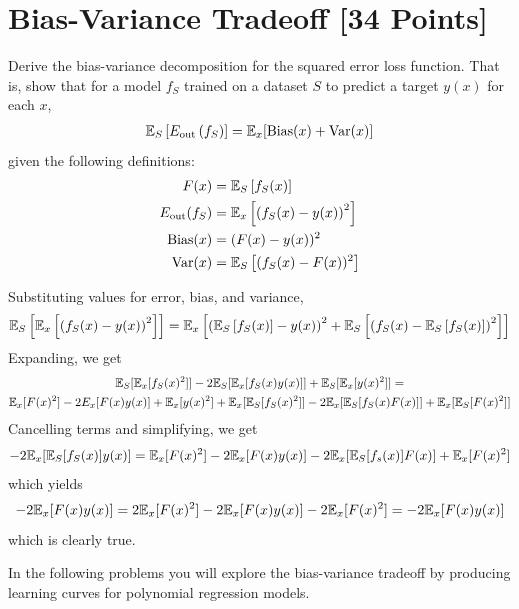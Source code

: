 
\newpage
\section{Bias-Variance Tradeoff [34 Points]}

\begin{problem}[5]
  Derive the bias-variance decomposition for the squared error loss function. That is, show that for a model $f_S$ trained on a dataset $S$ to predict a target $y(x)$ for each $x$,
  \begin{align*}
    \mathbb{E}_S \left[E_\text{out}\left(f_S\right)\right] = \mathbb{E}_x[\operatorname{Bias}(x) + \operatorname{Var}(x)]
  \end{align*}
  given the following definitions:
  \begin{align*}
    F(x) &= \mathbb{E}_S\left[f_S(x) \right] \\
    E_\text{out}(f_S) &= \mathbb{E}_x\left[\left(f_S(x) - y(x)\right)^2\right] \\
    \operatorname{Bias}(x) &= (F(x) - y(x))^2 \\
    \operatorname{Var}(x) &= \mathbb{E}_S\left[(f_S(x)-F(x))^2\right]
  \end{align*}
\end{problem}

\begin{solution}
  Substituting values for error, bias, and variance,
  \[
    \mathbb{E}_S \left[ \mathbb{E}_x \left[ \left( f_S(x) - y(x) \right) ^2 \right] \right] = \mathbb{E}_x \left[ \left( \mathbb{E}_S \left[ f_S(x) \right] - y(x) \right) ^2 + \mathbb{E}_S \left[ \left( f_S(x) - \mathbb{E}_S \left[ f_S(x) \right] \right) ^2 \right] \right]
  \]
  Expanding, we get
  \begin{multline*}
    \mathbb{E}_S [ \mathbb{E}_x [ f_S(x) ^2 ] ] - 2 \mathbb{E}_S [ \mathbb{E}_x [ f_S(x) y(x) ] ] + \mathbb{E}_S [ \mathbb{E}_x [ y(x)^2 ]] = \\
      \mathbb{E}_x [F(x)^2] - 2 E_x [F(x)y(x)] + \mathbb{E}_x[y(x)^2] + \mathbb{E}_x [ \mathbb{E}_S [f_S(x)^2] ] - 2 \mathbb{E}_x [ \mathbb{E}_S [ f_S(x) F(x) ] ] + \mathbb{E}_x [ \mathbb{E}_S [ F(x)^2 ] ]
  \end{multline*}
  Cancelling terms and simplifying, we get
  \[
    -2 \mathbb{E}_x [ \mathbb{E}_S [ f_S(x) ] y(x) ] = \mathbb{E}_x [ F(x)^2 ] - 2 \mathbb{E}_x [ F(x) y(x)] - 2 \mathbb{E}_x[ \mathbb{E}_S [ f_s(x) ] F(x) ] + \mathbb{E}_x [ F(x)^2]
  \]
  which yields
  \[
    -2 \mathbb{E}_x [ F(x) y(x) ] = 2 \mathbb{E}_x [ F(x) ^2 ] - 2 \mathbb{E}_x [ F(x) y(x) ] - 2 \mathbb{E}_x [ F(x)^2 ] = -2 \mathbb{E}_x [ F(x) y(x) ]
  \]
  which is clearly true.
\end{solution}

In the following problems you will explore the bias-variance tradeoff by producing learning curves for polynomial regression models.

